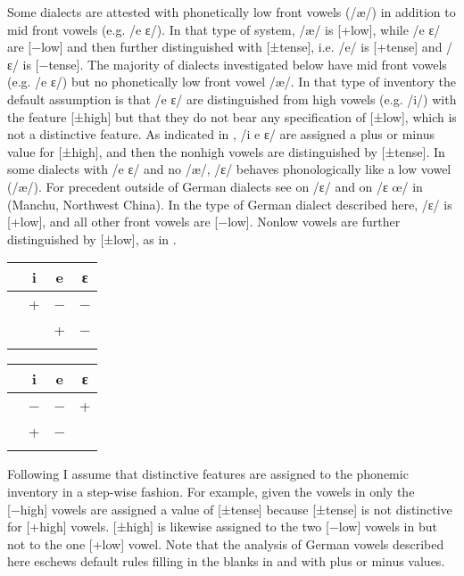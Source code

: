  Some dialects are attested with phonetically low front vowels (/æ/) in addition to mid front vowels (e.g. /e ɛ/). In that type of system, /æ/ is [+low], while /e ɛ/ are [−low] and then further distinguished with [±tense], i.e. /e/ is [+tense] and /ɛ/ is [−tense]. The majority of dialects investigated below have mid front vowels (e.g. /e ɛ/) but no phonetically low front vowel /æ/. In that type of inventory the default assumption is that /e ɛ/ are distinguished from high vowels (e.g. /i/) with the feature [±high] but that they do not bear any specification of [±low], which is not a distinctive feature. As indicated in , /i e ɛ/ are assigned a plus or minus value for [±high], and then the nonhigh vowels are distinguished by [±tense]. In some dialects with /e ɛ/ and no /æ/, /ɛ/ behaves phonologically like a low vowel (/æ/). For precedent outside of German dialects see \citet[78]{vanOostendorp2000} on  /ɛ/ and \citet[182]{Dresher2009} on /ɛ œ/ in  (Manchu, Northwest China). In the type of German dialect described here, /ɛ/ is [+low], and all other front vowels are [−low]. Nonlow vowels are further distinguished by [±low], as in .

 
\ea%
\label{ex:2:8}
\begin{multicols}{2}\raggedcolumns
\ea\label{ex:2:8a}
\begin{tabular}[t]{rccc}
\lsptoprule
      & i & e & ɛ  \\\midrule
\relax [high] & + & − & −  \\
\relax [tense] &  & + & −  \\
\lspbottomrule
\end{tabular}\columnbreak
\ex\label{ex:2:8b}\begin{tabular}[t]{rccc}
\lsptoprule
   & i & e & ɛ\\\midrule
\relax [low] & − & − & + \\
\relax [high] & + & − &  \\
\lspbottomrule
\end{tabular}
\z
\end{multicols}
\z

Following \citet{Dresher2009} I assume that distinctive features are assigned to the phonemic inventory in a step-wise fashion. For example, given the vowels in  only the [−high] vowels are assigned a value of [±tense] because [±tense] is not distinctive for [+high] vowels. [±high] is likewise assigned to the two [−low] vowels in  but not to the one [+low] vowel. Note that the analysis of German vowels described here eschews default rules filling in the blanks in  and  with plus or minus values.

